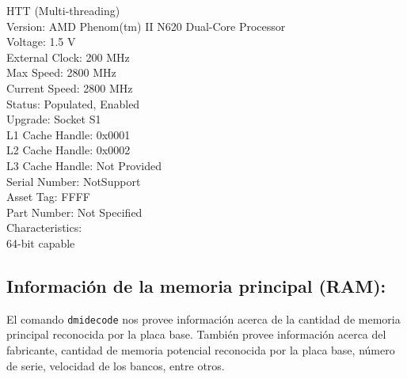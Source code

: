 \documentclass[12pt]{article}
\begin{document}
{{{		HTT (Multi-threading)\\
	Version: AMD Phenom(tm) II N620 Dual-Core Processor\\
	Voltage: 1.5 V\\
	External Clock: 200 MHz\\
	Max Speed: 2800 MHz\\
	Current Speed: 2800 MHz\\
	Status: Populated, Enabled\\
	Upgrade: Socket S1\\
	L1 Cache Handle: 0x0001\\
	L2 Cache Handle: 0x0002\\
	L3 Cache Handle: Not Provided\\
	Serial Number: NotSupport\\
	Asset Tag: FFFF\\
	Part Number: Not Specified\\
	Characteristics:\\
		64-bit capable
}
} \vspace*{0.5cm} }

\subsection*{Información de la memoria principal (RAM):}

El comando \texttt{dmidecode} nos provee información acerca de la cantidad de memoria 
principal reconocida por la placa base. También provee información acerca del fabricante, 
cantidad de memoria potencial reconocida por la placa base, número de serie, velocidad de los
bancos, entre otros. 
\end{document}
